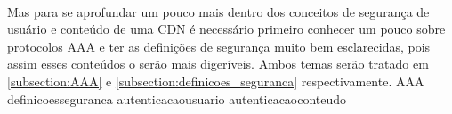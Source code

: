 \paragraph{}
Mas para se aprofundar um pouco mais dentro dos conceitos de seguran\c{c}a de usu\'ario e conte\'udo de uma CDN \'e necess\'ario primeiro conhecer um pouco sobre protocolos AAA e ter as defini\c{c}\~oes de seguran\c{c}a muito bem esclarecidas, pois assim esses conte\'udos o ser\~ao mais diger\'iveis. Ambos temas ser\~ao tratado em \ref{subsection:AAA} e \ref{subsection:definicoes_seguranca} respectivamente.
{AAA}
{definicoesseguranca}
{autenticacaousuario}
{autenticacaoconteudo}